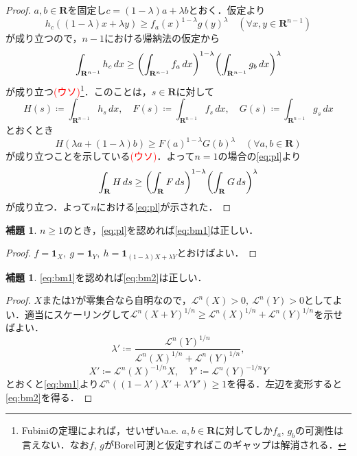 \documentclass[a4j]{ltjsarticle}
\newcommand{\Rset}{\mathbf{R}}
\newcommand{\Lm}{\mathcal{L}}
\newcommand{\1}{\bm{1}}
\numberwithin{equation}{section}
\theoremstyle{definition}
\newtheorem{lem}[thm]{補題}
\begin{document}
\begin{proof}
    $a,b\in\Rset$を固定し$c=(1-\lambda)a+\lambda b$とおく．仮定より
    \begin{equation}
        h_c((1-\lambda)x+\lambda y)\geq f_a(x)^{1-\lambda}g(y)^{\lambda}\quad (\forall x,y\in\Rset^{n-1})
    \end{equation}
    が成り立つので，$n-1$における帰納法の仮定から
    \begin{equation}
        \int_{\Rset^{n-1}}h_c\,dx\geq \qty(\int_{\Rset^{n-1}}f_a\,dx)^{1-\lambda}\qty(\int_{\Rset^{n-1}}g_b\,dx)^{\lambda}
    \end{equation}
    が成り立つ\textcolor{red}{(ウソ)}\footnote{Fubiniの定理によれば，せいぜいa.e. $a,b\in\Rset$に対してしか$f_a,\,g_b$の可測性は言えない．なお$f,\,g$がBorel可測と仮定すればこのギャップは解消される．}．このことは，$s\in\Rset$に対して
    \begin{equation}
        H(s)\coloneqq \int_{\Rset^{n-1}}h_s\,dx,\quad F(s)\coloneqq \int_{\Rset^{n-1}}f_s\,dx,\quad G(s)\coloneqq \int_{\Rset^{n-1}}g_s\,dx
    \end{equation}
    とおくとき
    \begin{equation}
        H(\lambda a+(1-\lambda)b)\geq F(a)^{1-\lambda}G(b)^{\lambda}\quad (\forall a,b\in\Rset)
    \end{equation}
    が成り立つことを示している\textcolor{red}{(ウソ)}．よって$n=1$の場合の\eqref{eq:pl}より
    \begin{equation}
        \int_{\Rset}H\,ds\geq \qty(\int_{\Rset}F\,ds)^{1-\lambda}\qty(\int_{\Rset}G\,ds)^{\lambda}
    \end{equation}
    が成り立つ．よって$n$における\eqref{eq:pl}が示された．
\end{proof}
\begin{lem}\label{lem:pl_implies_bm1}
    $n\geq 1$のとき，\eqref{eq:pl}を認めれば\eqref{eq:bm1}は正しい．
\end{lem}
\begin{proof}
    $f=\1_{X},\ g=\1_{Y},\ h=\1_{(1-\lambda)X+\lambda Y}$とおけばよい．
\end{proof}
\begin{lem}\label{lem:bm1_implies_bm2}
    \eqref{eq:bm1}を認めれば\eqref{eq:bm2}は正しい．
\end{lem}
\begin{proof}
    $X$または$Y$が零集合なら自明なので，$\Lm^n(X)>0,\ \Lm^n(Y)>0$としてよい．適当にスケーリングして$\Lm^n(X+Y)^{1/n}\geq \Lm^n(X)^{1/n}+\Lm^n(Y)^{1/n}$を示せばよい．
    \begin{equation}
        \lambda'\coloneqq \frac{\Lm^n(Y)^{1/n}}{\Lm^n(X)^{1/n}+\Lm^n(Y)^{1/n}},
    \end{equation}
    \begin{equation}
        X'\coloneqq \Lm^n(X)^{-1/n}X,\quad Y'\coloneqq \Lm^n(Y)^{-1/n}Y
    \end{equation}
    とおくと\eqref{eq:bm1}より$\Lm^n((1-\lambda')X'+\lambda'Y')\geq1$を得る．左辺を変形すると\eqref{eq:bm2}を得る．
\end{proof}
\end{document}
